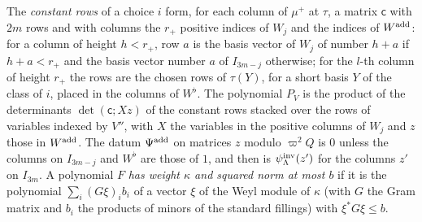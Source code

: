 
The \emph{constant rows} of a choice $i$ form, for each column of $\mu^+$ at $\tau$, a matrix $\mathsf c$ with $2m$ rows and with columns the $r_+$ positive indices of $W_j$ and the indices of $W^{\rm add}$: for a column of height $h<r_+$, row $a$ is the
basis vector of $W_j$ of number $h+a$ if $h+a<r_+$ and the basis vector number $a$ of $I_{3m-j}$ otherwise; for the $l$-th column of height $r_+$ the rows are the chosen rows of $\tau(Y)$, for a short basis $Y$ of the class of $i$,
placed in the columns of $W^\flat$. The polynomial $P_V$ is the product of the determinants $\det(\mathsf c;Xz)$ of the constant rows stacked over the rows of variables indexed by $V''$, with $X$ the variables in the positive columns of
$W_j$ and $z$ those in $W^{\rm add}$. The datum $\Psi^{\rm add}$ on matrices $z$ modulo $\varpi^2Q$ is $0$ unless the columns on $I_{3m-j}$ and $W^\flat$ are those of $1$, and then is $\psi^{\rm inv}_\Lambda(z')$ for the columns $z'$ on $I_{3m}$. A
polynomial $F$ \emph{has weight $\kappa$ and squared norm at most $b$} if it is the polynomial $\sum_i(G\xi)_ib_i$ of a vector $\xi$ of the Weyl module of $\kappa$ (with $G$ the Gram matrix and $b_i$ the products of minors of the standard
fillings) with $\xi^*G\xi\le b$.

